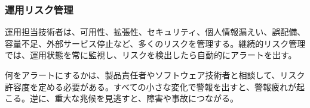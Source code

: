 \subsubsection{運用リスク管理}

運用担当技術者は、可用性、拡張性、セキュリティ、個人情報漏えい、誤配備、容量不足、外部サービス停止など、多くのリスクを管理する。継続的リスク管理では、運用状態を常に監視し、リスクを検出したら自動的にアラートを出す。

何をアラートにするかは、製品責任者やソフトウェア技術者と相談して、リスク許容度を定める必要がある。すべての小さな変化で警報を出すと、警報疲れが起こる。逆に、重大な兆候を見逃すと、障害や事故につながる。
